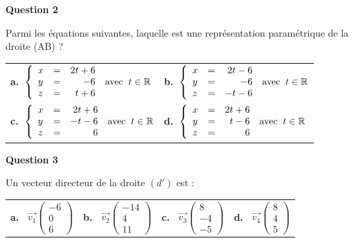 \documentclass[10pt]{article}
\providecommand{\R}{\mathbb{R}}
\providecommand{\vect}[1]{\overrightarrow{#1}}
\begin{document}
\medskip

\textbf{Question 2}

Parmi les équations suivantes, laquelle est une représentation paramétrique de la droite (AB) ?

\begin{center}
\begin{tabularx}{\linewidth}{*{2}{X}}
\textbf{a.~}$\left\{\begin{array}{l c r}
x &=& 2t + 6\\
y &=&-6\\
z&=&t+6
\end{array}\right. \:\text{avec }\: t \in \R$&
\textbf{b.~}$\left\{\begin{array}{l c r}
x &=& 2t - 6\\
y &=&- 6\\
z&=&- t - 6
\end{array}\right. \:\text{avec }\: t \in \R$\\
\textbf{c.~}$\left\{\begin{array}{l c r}
x &=& 2t + 6\\
y &=&-t -6\\
z&=&6
\end{array}\right. \:\text{avec }\: t \in \R$&
\textbf{d.~}$\left\{\begin{array}{l c r}
x &=& 2t + 6\\
y &=&t - 6\\
z&=&6
\end{array}\right. \:\text{avec }\: t \in \R$
\end{tabularx}
\end{center}

\medskip

\textbf{Question 3}

Un vecteur directeur de la droite $\left(d'\right)$ est :

\begin{center}
\begin{tabularx}{\linewidth}{*{4}{X}}
\textbf{a.~} $\vect{v_1}\begin{pmatrix}-6\\0\\6\end{pmatrix}$&
\textbf{b.~} $\vect{v_2}\begin{pmatrix}-14\\4\\11\end{pmatrix}$&
\textbf{c.~} $\vect{v_3}\begin{pmatrix}8\\-4\\-5\end{pmatrix}$&
\textbf{d.~} $\vect{v_4}\begin{pmatrix}8\\4\\5\end{pmatrix}$
\end{tabularx}
\end{center}
\end{document}

